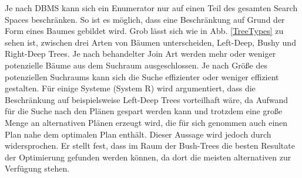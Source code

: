 Je nach \ac{DBMS} kann sich ein Enumerator nur auf einen Teil des gesamten Search Spaces beschränken. So ist es möglich, dass eine Beschränkung auf Grund der Form eines Baumes gebildet wird. Grob lässt sich wie in Abb. \ref{TreeTypes} zu sehen ist, zwischen drei Arten von Bäumen unterscheiden, Left-Deep, Bushy und Right-Deep Trees. Je nach behandelter Join Art werden mehr oder weniger potenzielle Bäume aus dem Suchraum ausgeschlossen. Je nach Größe des potenziellen Suchraums kann sich die Suche effizienter oder weniger effizient gestalten. Für einige Systeme (System R) wird argumentiert, dass die Beschränkung auf beispielsweise Left-Deep Trees vorteilhaft wäre, da Aufwand für die Suche nach den Plänen gespart werden kann und trotzdem eine große Menge an alternativen Plänen erzeugt wird, die für sich genommen auch einen Plan nahe dem optimalen Plan enthält. Dieser Aussage wird jedoch durch \cite{ioannidis1991left} widersprochen. Er stellt fest, dass im Raum der Bush-Trees die besten Resultate der Optimierung gefunden werden können, da dort die meisten alternativen zur Verfügung stehen. 